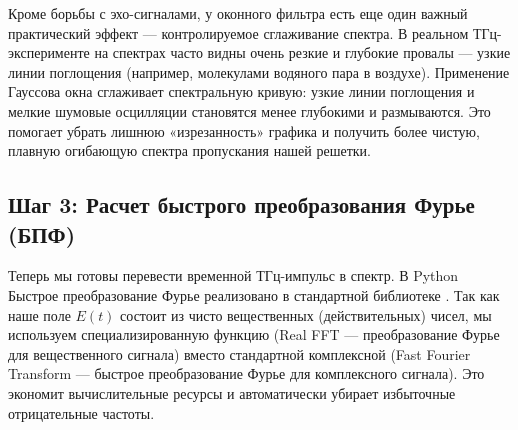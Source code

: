 Кроме борьбы с эхо-сигналами, у оконного фильтра есть еще один важный практический эффект — контролируемое сглаживание спектра. В реальном ТГц-эксперименте на спектрах часто видны очень резкие и глубокие провалы — узкие линии поглощения (например, молекулами водяного пара в воздухе). Применение Гауссова окна сглаживает спектральную кривую: узкие линии поглощения и мелкие шумовые осцилляции становятся менее глубокими и размываются. Это помогает убрать лишнюю «изрезанность» графика и получить более чистую, плавную огибающую спектра пропускания нашей решетки.


\subsection{Шаг 3: Расчет быстрого преобразования Фурье (БПФ)}

Теперь мы готовы перевести временной ТГц-импульс в спектр. В Python Быстрое преобразование Фурье реализовано в стандартной библиотеке . Так как наше поле $E(t)$ состоит из чисто вещественных (действительных) чисел, мы используем специализированную функцию  (Real FFT --- преобразование Фурье для вещественного сигнала) вместо стандартной комплексной  (Fast Fourier Transform --- быстрое преобразование Фурье для комплексного сигнала). Это экономит вычислительные ресурсы и автоматически убирает избыточные отрицательные частоты.


